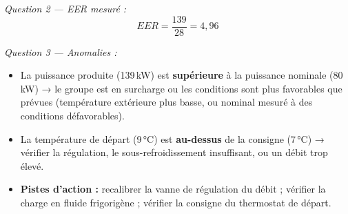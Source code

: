 \textit{Question 2 — EER mesuré :}
\[
  EER = \frac{139}{28} = \boxed{4{,}96}
\]

\textit{Question 3 — Anomalies :}
\begin{itemize}
  \item La puissance produite (139\,kW) est \textbf{supérieure} à la puissance nominale (80\,kW) → le groupe est en surcharge ou les conditions sont plus favorables que prévues (température extérieure plus basse, ou nominal mesuré à des conditions défavorables).
  \item La température de départ (9\,°C) est \textbf{au-dessus} de la consigne (7\,°C) → vérifier la régulation, le sous-refroidissement insuffisant, ou un débit trop élevé.
  \item \textbf{Pistes d'action :} recalibrer la vanne de régulation du débit ; vérifier la charge en fluide frigorigène ; vérifier la consigne du thermostat de départ.
\end{itemize}
